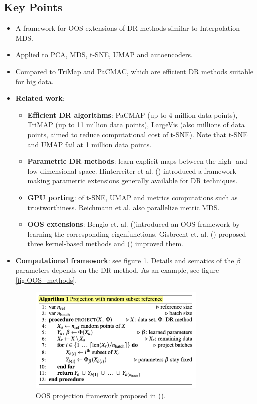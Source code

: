 \documentclass[a4paper,12pt]{article}
\begin{document}
\subsection{Key Points}

\begin{itemize}
    \item A framework for OOS extensions of DR methods similar to Interpolation MDS.
    \item Applied to PCA, MDS, t-SNE, UMAP and autoencoders.
    \item Compared to TriMap and PaCMAC, which are efficient DR methods suitable for big data.
    \item \textbf{Related work}:
    \begin{itemize}
        \item \textbf{Efficient DR algorithms}: PaCMAP (up to 4 million data points), TriMAP (up to 11 million data points), LargeVis (also millions of data points, aimed to reduce computational cost of t-SNE). Note that t-SNE and UMAP fail at 1 million data points.
        \item \textbf{Parametric DR methods}: learn explicit maps between the high- and low-dimensional space.  Hinterreiter et al. (\cite{Hinterreiter2023}) introduced a framework making parametric extensions generally available for DR techniques.
        \item \textbf{GPU porting}: of t-SNE, UMAP and metrics computations such as trustworthiness. Reichmann et al. also parallelize metric MDS.
        \item \textbf{OOS extensions}: Bengio et. al. (\cite{Bengio2003})introduced an OOS framework by learning the corresponding eigenfunctions. Gisbrecht et. al. (\cite{Gisbrecht2012}) proposed three kernel-based methods and (\cite{Zhang2021}) improved them.
    \end{itemize}
    \item \textbf{Computational framework}: see figure \ref{fig:OOS_algorithm}. Details and sematics of the $\beta$ parameters depends on the DR method. As an example, see figure \ref{fig:OOS_methods}.
    
    \begin{figure}[ht]
        \centering
        \includegraphics[width=0.8\textwidth]{figures/OOS_algorithm.png}
        \caption{OOS projection framework proposed in (\cite{Reichmann2024}).}
        \label{fig:OOS_algorithm}
    \end{figure}


\end{itemize}
\end{document}
